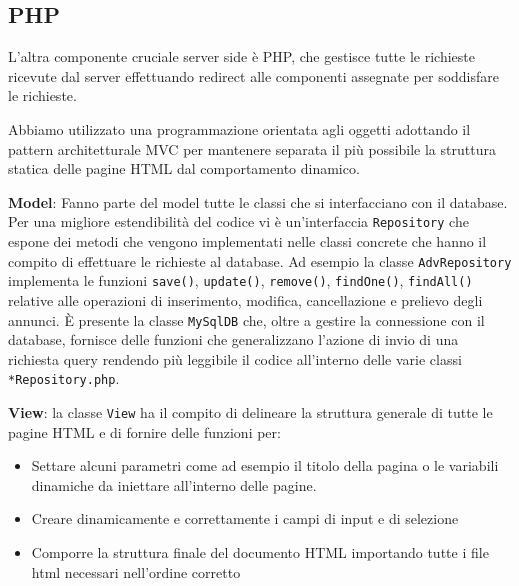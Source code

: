 	\subsection{PHP}
	\par L’altra componente cruciale server side è PHP, che gestisce tutte le richieste ricevute dal server effettuando redirect alle componenti assegnate per soddisfare le richieste.
  \par Abbiamo utilizzato una programmazione orientata agli oggetti adottando il pattern architetturale MVC per mantenere separata il pi\`u possibile la struttura statica delle pagine HTML dal comportamento dinamico.
  \par \textbf{Model}: Fanno parte del model tutte le classi che si interfacciano con il database. Per una migliore estendibilit\`a del codice vi \`e un'interfaccia \texttt{Repository} che espone dei metodi che vengono implementati nelle classi concrete che hanno il compito di effettuare le richieste al database. Ad esempio la classe \texttt{AdvRepository} implementa le funzioni \texttt{save()}, \texttt{update()}, \texttt{remove()}, \texttt{findOne()}, \texttt{findAll()} relative alle operazioni di inserimento, modifica, cancellazione e prelievo degli annunci. \`E presente la classe \texttt{MySqlDB} che, oltre a gestire la connessione con il database, fornisce delle funzioni che generalizzano l'azione di invio di una richiesta query rendendo pi\`u leggibile il codice all'interno delle varie classi \texttt{*Repository.php}.

   \par \textbf{View}: la classe \texttt{View} ha il compito di delineare la struttura generale di tutte le pagine HTML e di fornire delle funzioni per:
    \begin{itemize}
      \item Settare alcuni parametri come ad esempio il titolo della pagina o le variabili dinamiche da iniettare all'interno delle pagine.
      \item Creare dinamicamente e correttamente i campi di input e di selezione
      \item Comporre la struttura finale del documento HTML importando tutte i file html necessari nell'ordine corretto  
    \end{itemize}

